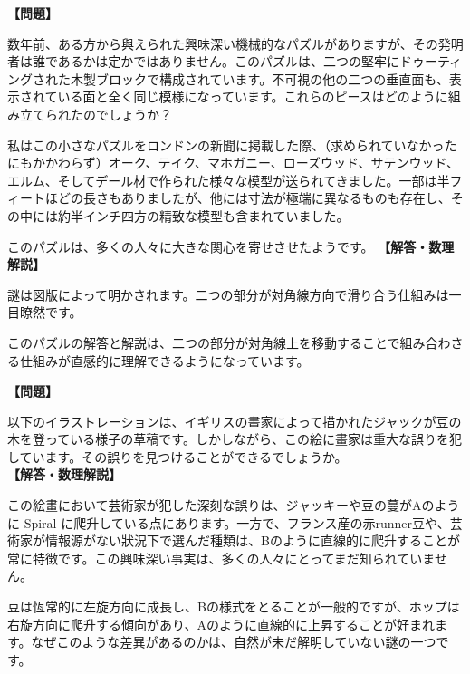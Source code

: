 \documentclass[10pt,a4paper,oneside,openany]{ltjsbook}
\begin{document}
\begin{tcolorbox}[colback=softblue,colframe=primaryblue,title=\textbf{第 424 問：dovetailed ブロック （原題: THE DOVETAILED BLOCK.）},arc=2mm,boxrule=1pt,breakable]
\textbf{【問題】}\par\vspace{0.3em}
数年前、ある方から與えられた興味深い機械的なパズルがありますが、その発明者は誰であるかは定かではありません。このパズルは、二つの堅牢にドゥーティングされた木製ブロックで構成されています。不可視の他の二つの垂直面も、表示されている面と全く同じ模様になっています。これらのピースはどのように組み立てられたのでしょうか？

私はこの小さなパズルをロンドンの新聞に掲載した際、（求められていなかったにもかかわらず）オーク、テイク、マホガニー、ローズウッド、サテンウッド、エルム、そしてデール材で作られた様々な模型が送られてきました。一部は半フィートほどの長さもありましたが、他には寸法が極端に異なるものも存在し、その中には約半インチ四方の精致な模型も含まれていました。

このパズルは、多くの人々に大きな関心を寄せさせたようです。
\tcblower
\textbf{【解答・数理解説】}\par\vspace{0.3em}
謎は図版によって明かされます。二つの部分が対角線方向で滑り合う仕組みは一目瞭然です。

このパズルの解答と解説は、二つの部分が対角線上を移動することで組み合わさる仕組みが直感的に理解できるようになっています。
\end{tcolorbox}

\begin{tcolorbox}[colback=softblue,colframe=primaryblue,title=\textbf{第 425 問：ジャックと豆のstalkに関する物語 （原題: JACK AND THE BEANSTALK.）},arc=2mm,boxrule=1pt,breakable]
\textbf{【問題】}\par\vspace{0.3em}
以下のイラストレーションは、イギリスの畫家によって描かれたジャックが豆の木を登っている様子の草稿です。しかしながら、この絵に畫家は重大な誤りを犯しています。その誤りを見つけることができるでしょうか。
\tcblower
\textbf{【解答・数理解説】}\par\vspace{0.3em}
この絵畫において芸術家が犯した深刻な誤りは、ジャッキーや豆の蔓がAのように Spiral に爬升している点にあります。一方で、フランス産の赤runner豆や、芸術家が情報源がない狀況下で選んだ種類は、Bのように直線的に爬升することが常に特徴です。この興味深い事実は、多くの人々にとってまだ知られていません。

豆は恆常的に左旋方向に成長し、Bの様式をとることが一般的ですが、ホップは右旋方向に爬升する傾向があり、Aのように直線的に上昇することが好まれます。なぜこのような差異があるのかは、自然が未だ解明していない謎の一つです。
\end{tcolorbox}
\end{document}
